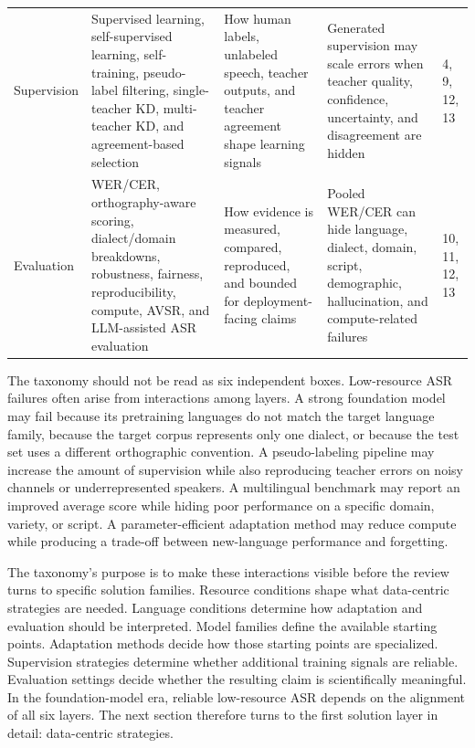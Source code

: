 \documentclass[pdflatex,sn-basic]{sn-jnl}
\theoremstyle{thmstyleone}
\theoremstyle{thmstyletwo}
\theoremstyle{thmstylethree}
\begin{document}
\begin{table}[htbp]
\begin{tabularx}{\textwidth}{YYYYY}
Supervision & Supervised learning, self-supervised learning, self-training, pseudo-label filtering, single-teacher KD, multi-teacher KD, and agreement-based selection & How human labels, unlabeled speech, teacher outputs, and teacher agreement shape learning signals & Generated supervision may scale errors when teacher quality, confidence, uncertainty, and disagreement are hidden & 4, 9, 12, 13 \\
Evaluation & WER/CER, orthography-aware scoring, dialect/domain breakdowns, robustness, fairness, reproducibility, compute, AVSR, and LLM-assisted ASR evaluation & How evidence is measured, compared, reproduced, and bounded for deployment-facing claims & Pooled WER/CER can hide language, dialect, domain, script, demographic, hallucination, and compute-related failures & 10, 11, 12, 13 \\
\bottomrule
\end{tabularx}
\end{table}

The taxonomy should not be read as six independent boxes. Low-resource ASR failures often arise from interactions among layers. A strong foundation model may fail because its pretraining languages do not match the target language family, because the target corpus represents only one dialect, or because the test set uses a different orthographic convention. A pseudo-labeling pipeline may increase the amount of supervision while also reproducing teacher errors on noisy channels or underrepresented speakers. A multilingual benchmark may report an improved average score while hiding poor performance on a specific domain, variety, or script. A parameter-efficient adaptation method may reduce compute while producing a trade-off between new-language performance and forgetting.

The taxonomy's purpose is to make these interactions visible before the review turns to specific solution families. Resource conditions shape what data-centric strategies are needed. Language conditions determine how adaptation and evaluation should be interpreted. Model families define the available starting points. Adaptation methods decide how those starting points are specialized. Supervision strategies determine whether additional training signals are reliable. Evaluation settings decide whether the resulting claim is scientifically meaningful. In the foundation-model era, reliable low-resource ASR depends on the alignment of all six layers. The next section therefore turns to the first solution layer in detail: data-centric strategies.
\end{document}
